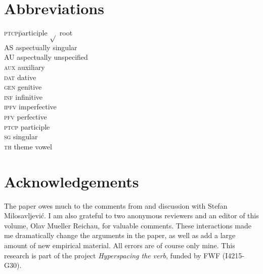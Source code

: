 \documentclass[output=paper]{langscibook}
\begin{document}
\section*{Abbreviations}

\begin{multicols}{2}
\begin{tabbing}
\textsc{ptcp}\hspace{.5em}\= participle\kill
\textsc{$\surd{}$} \> root\\
\textsc{AS} \> aspectually singular\\
\textsc{AU} \> aspectually unspecified\\
\textsc{aux} \> auxiliary\\
\textsc{dat} \> dative\\
\textsc{gen} \> genitive\\
\textsc{inf} \> infinitive\\
\textsc{ipfv} \> imperfective\\
\textsc{pfv} \> perfective\\
\textsc{ptcp} \> participle\\
\textsc{sg} \> singular\\
\textsc{th} \> theme vowel
\end{tabbing}
\end{multicols}

\section*{Acknowledgements}
The paper owes much to the comments from and discussion with Stefan Milosavljević. I am also grateful to two anonymous reviewers and an editor of this volume, Olav Mueller Reichau, for valuable comments. These interactions made me dramatically change the arguments in the paper, as well as add a large amount of new empirical material. All errors are of course only mine. This research is part of the project \textit{Hyperspacing the verb}, funded by FWF (I4215-G30).

\printbibliography[heading=subbibliography,notkeyword=this]
\end{document}
